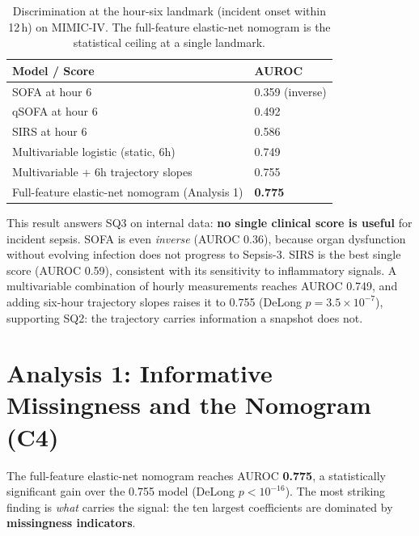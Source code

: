 \begin{table}[H]
    \centering
    \begin{tabular}{p{9cm}|p{3cm}}
        \hline
        \textbf{Model / Score} & \textbf{AUROC} \\
        \hline\hline
        SOFA at hour 6                              & 0.359 (inverse) \\
        qSOFA at hour 6                             & 0.492 \\
        SIRS at hour 6                              & 0.586 \\
        \hline
        Multivariable logistic (static, 6h)        & 0.749 \\
        Multivariable + 6h trajectory slopes       & 0.755 \\
        Full-feature elastic-net nomogram (Analysis 1)  & \textbf{0.775} \\
        \hline
    \end{tabular}
    \caption{Discrimination at the hour-six landmark (incident onset within
    12\,h) on MIMIC-IV. The full-feature elastic-net nomogram is the
    statistical ceiling at a single landmark.}
    \label{table:bench}
\end{table}

This result answers SQ3 on internal data: \textbf{no single clinical score
is useful} for incident sepsis. SOFA is even \emph{inverse} (AUROC 0.36),
because organ dysfunction without evolving infection does not progress to
Sepsis-3. SIRS is the best single score (AUROC 0.59), consistent with its
sensitivity to inflammatory signals. A multivariable combination of hourly
measurements reaches AUROC 0.749, and adding six-hour trajectory slopes
raises it to 0.755 (DeLong $p = 3.5 \times 10^{-7}$), supporting SQ2: the
trajectory carries information a snapshot does not.

\section{Analysis 1: Informative Missingness and the Nomogram (C4)}

The full-feature elastic-net nomogram reaches AUROC \textbf{0.775}, a
statistically significant gain over the 0.755 model (DeLong $p < 10^{-16}$).
The most striking finding is \emph{what} carries the signal: the ten largest
coefficients are dominated by \textbf{missingness indicators}.

